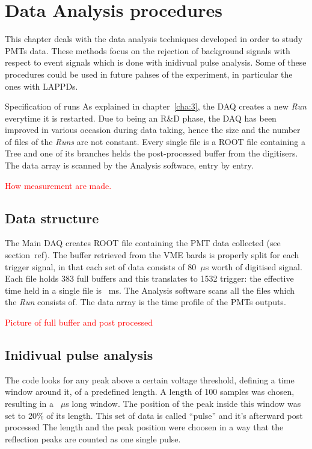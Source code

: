 
\chapter{Data Analysis procedures}
\label{cha:4}
This chapter deals with the data analysis techniques developed in order to study PMTs data.
These methods focus on the rejection of background signals with respect to event signals which is %
done with inidivual pulse analysis.
Some of these procedures could be used in future pahses of the experiment, in particular %
the ones with LAPPDs.

Specification of runs
As explained in chapter~\ref{cha:3}, the DAQ creates a new \emph{Run} everytime it is restarted.
Due to being an R\&D phase, the DAQ has been improved in various occasion during data taking, %
hence the size and the number of files of the \emph{Runs} are not constant.
Every single file is a ROOT file containing a Tree and one of its branches helds the post-processed %
buffer from the digitisers.
The data array is scanned by the Analysis software, entry by entry.

\textcolor{red}{How measurement are made.}

\section{Data structure}
The Main DAQ creates ROOT file containing the PMT data collected (see section~ref).
The buffer retrieved from the VME bards is properly split for each trigger signal, in that each %
set of data consists of 80~$\mu$s worth of digitised signal.
Each file holds 383 full buffers and this translates to 1532 trigger: the effective time held in %
a single file is ~ms.
The Analysis software scans all the files which the \emph{Run} consists of.
The data array is the time profile of the PMTs outputs.

\textcolor{red}{Picture of full buffer and post processed}


\section{Inidivual pulse analysis}

The code looks for any peak above a certain voltage threshold, defining a time window %
around it, of a predefined length.
A length of 100 samples was chosen, resulting in a ~$\mu$s long window.
The position of the peak inside this window was set to 20\% of its length.
This set of data is called ``pulse'' and it's afterward post processed
The length and the peak position were choosen in a way that the reflection peaks are counted as %
one single pulse.

